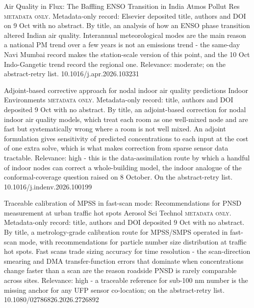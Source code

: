 \documentclass[10pt]{article}
\begin{document}
{Air Quality in Flux: The Baffling ENSO Transition in India}
{Atmos Pollut Res}
{\textsc{metadata only.} Metadata-only record: Elsevier deposited title, authors and DOI on 9 Oct with no abstract. By title, an analysis of how an ENSO phase transition altered Indian air quality. Interannual meteorological modes are the main reason a national PM trend over a few years is not an emissions trend - the same-day Navi Mumbai record makes the station-scale version of this point, and the 10 Oct Indo-Gangetic trend record the regional one. Relevance: moderate; on the abstract-retry list.}
{10.1016/j.apr.2026.103231}

{Adjoint-based corrective approach for nodal indoor air quality predictions}
{Indoor Environments}
{\textsc{metadata only.} Metadata-only record: title, authors and DOI deposited 9 Oct with no abstract. By title, an adjoint-based correction for nodal indoor air quality models, which treat each room as one well-mixed node and are fast but systematically wrong where a room is not well mixed. An adjoint formulation gives sensitivity of predicted concentrations to each input at the cost of one extra solve, which is what makes correction from sparse sensor data tractable. Relevance: high - this is the data-assimilation route by which a handful of indoor nodes can correct a whole-building model, the indoor analogue of the conformal-coverage question raised on 8 October. On the abstract-retry list.}
{10.1016/j.indenv.2026.100199}

\par{}\baselineskip{}\baselineskip
{}

{Traceable calibration of MPSS in fast-scan mode: Recommendations for PNSD measurement at urban traffic hot spots}
{Aerosol Sci Technol}
{\textsc{metadata only.} Metadata-only record: title, authors and DOI deposited 9 Oct with no abstract. By title, a metrology-grade calibration route for MPSS/SMPS operated in fast-scan mode, with recommendations for particle number size distribution at traffic hot spots. Fast scans trade sizing accuracy for time resolution - the scan-direction smearing and DMA transfer-function errors that dominate when concentrations change faster than a scan are the reason roadside PNSD is rarely comparable across sites. Relevance: high - a traceable reference for sub-100 nm number is the missing anchor for any UFP sensor co-location; on the abstract-retry list.}
{10.1080/02786826.2026.2726892}
\end{document}

